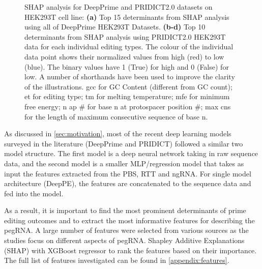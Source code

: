 \begin{figure}
    \centering
    \caption[SHAP analysis for DeepPrime and PRIDICT2.0 datasets on HEK293T cell line.]{SHAP analysis for DeepPrime and PRIDICT2.0 datasets on HEK293T cell line: \textbf{(a)} Top 15 determinants from SHAP analysis using all of DeepPrime HEK293T Datasets. \textbf{(b-d)} Top 10 determinants from SHAP analysis using PRIDICT2.0 HEK293T data for each individual editing types. The colour of the individual data point shows their normalized values from high (red) to low (blue). The binary values have 1 (True) for high and 0 (False) for low. A number of shorthands have been used to improve the clarity of the illustrations. gcc for GC Content (different from GC count); et for editing type; tm for melting temperature; mfe for minimum free energy; n ap \# for base n at protospacer position \#; max cns for the length of maximum consecutive sequence of base n.} 
    \label{fig:shap}
\end{figure}

As discussed in \autoref{sec:motivation}, most of the recent deep learning models surveyed in the literature (DeepPrime\cite{yuPredictionEfficienciesDiverse2023} and PRIDICT\cite{mathisPredictingPrimeEditing2023,mathisMachineLearningPrediction2024}) followed a similar two model structure. The first model is a deep neural network taking in raw sequence data, and the second model is a smaller MLP/regression model that takes as input the features extracted from the PBS, RTT and ngRNA. For single model architecture (DeepPE\cite{kimPredictingEfficiencyPrime2021}), the features are concatenated to the sequence data and fed into the model.

As a result, it is important to find the most prominent determinants of prime editing outcomes and to extract the most informative features for describing the pegRNA. A large number of features were selected from various sources as the studies focus on different aspects of pegRNA. Shapley Additive Explanations (SHAP) with XGBoost regressor to rank the features based on their importance. The full list of features investigated can be found in \autoref{appendix:features}. 

